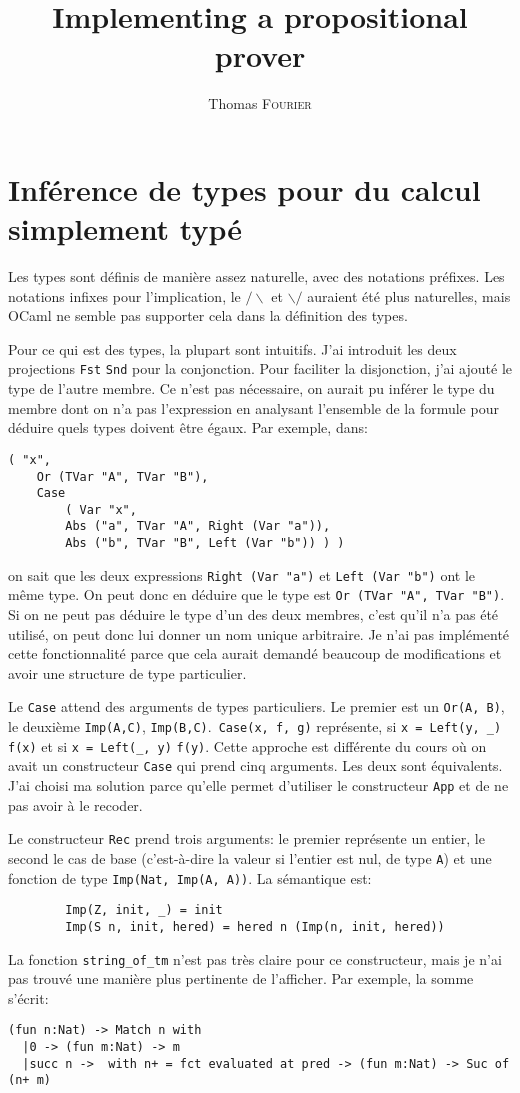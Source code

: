 \documentclass[a4paper]{article}
\author{Thomas \textsc{Fourier}}
\title{Implementing a propositional prover}
\begin{document}
    \maketitle
    \section{Inférence de types pour du calcul simplement typé}

    Les types sont définis de manière assez naturelle, avec des notations préfixes. Les notations infixes pour l'implication, le $/\backslash$ et $\backslash/$ auraient été plus naturelles, mais OCaml ne semble pas supporter cela dans la définition des types. 

    Pour ce qui est des types, la plupart sont intuitifs. J'ai introduit les deux projections \verb|Fst| \verb|Snd| pour la conjonction. Pour faciliter la disjonction, j'ai ajouté le type de l'autre membre. Ce n'est pas nécessaire, on aurait pu inférer le type du membre dont on n'a pas l'expression en analysant l'ensemble de la formule pour déduire quels types doivent être égaux. Par exemple, dans:
    \begin{verbatim}
( "x",
    Or (TVar "A", TVar "B"),
    Case
        ( Var "x",
        Abs ("a", TVar "A", Right (Var "a")),
        Abs ("b", TVar "B", Left (Var "b")) ) )
    \end{verbatim}
    on sait que les deux expressions \verb|Right (Var "a")| et \verb|Left (Var "b")| ont le même type. On peut donc en déduire que le type est \verb|Or (TVar "A", TVar "B")|. Si on ne peut pas déduire le type d'un des deux membres, c'est qu'il n'a pas été utilisé, on peut donc lui donner un nom unique arbitraire. Je n'ai pas implémenté cette fonctionnalité parce que cela aurait demandé beaucoup de modifications et avoir une structure de type particulier. 

    Le \verb|Case| attend des arguments de types particuliers. Le premier est un \verb|Or(A, B)|, le deuxième \verb|Imp(A,C)|, \verb|Imp(B,C)|.\ \verb|Case(x, f, g)| représente, si \verb|x = Left(y, _)| \verb|f(x)| et si \verb|x = Left(_, y)| \verb|f(y)|. Cette approche est différente du cours où on avait un constructeur \verb|Case| qui prend cinq arguments. Les deux sont équivalents. J'ai choisi ma solution parce qu'elle permet d'utiliser le constructeur \verb|App| et de ne pas avoir à le recoder.

    Le constructeur \verb|Rec| prend trois arguments: le premier représente un entier, le second le cas de base (c'est-à-dire la valeur si l'entier est nul, de type \verb|A|) et une fonction de type \verb|Imp(Nat, Imp(A, A))|. La sémantique est:
    \begin{verbatim}
        Imp(Z, init, _) = init
        Imp(S n, init, hered) = hered n (Imp(n, init, hered))
    \end{verbatim}
    La fonction \verb|string_of_tm| n'est pas très claire pour ce constructeur, mais je n'ai pas trouvé une manière plus pertinente de l'afficher. Par exemple, la somme s'écrit:
    \begin{verbatim}
(fun n:Nat) -> Match n with 
  |0 -> (fun m:Nat) -> m
  |succ n ->  with n+ = fct evaluated at pred -> (fun m:Nat) -> Suc of (n+ m)
    \end{verbatim}
\end{document}
